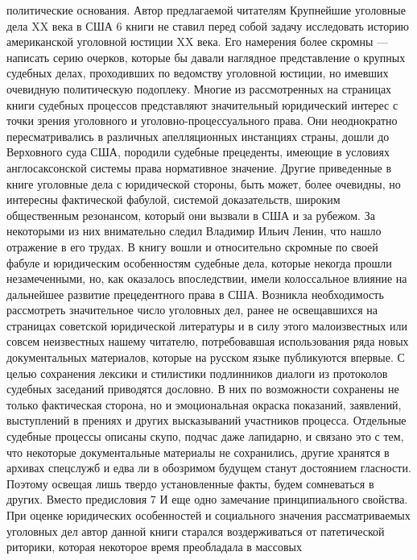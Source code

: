 \documentclass[12pt, a4paper, openany]{book}
\begin{document}
политические основания. Автор предлагаемой читателям 
Крупнейшие уголовные дела XX века в США 
6 
книги не ставил перед собой задачу исследовать историю 
американской уголовной юстиции XX века. Его намерения 
более скромны — написать серию очерков, которые бы 
давали наглядное представление о крупных судебных 
делах, проходивших по ведомству уголовной юстиции, но 
имевших очевидную политическую подоплеку. 
Многие из рассмотренных на страницах книги  
судебных процессов представляют значительный юридический 
интерес с точки зрения уголовного и  
уголовно-процессуального права. Они неоднократно пересматривались в  
различных апелляционных инстанциях страны, дошли до  
Верховного суда США, породили судебные прецеденты, имеющие 
в условиях англосаксонской системы права нормативное 
значение. Другие приведенные в книге уголовные дела 
с юридической стороны, быть может, более очевидны, но 
интересны фактической фабулой, системой доказательств, 
широким общественным резонансом, который они вызвали 
в США и за рубежом. За некоторыми из них внимательно 
следил Владимир Ильич Ленин, что нашло отражение в его 
трудах. 
В книгу вошли и относительно скромные по своей 
фабуле и юридическим особенностям судебные дела, 
которые некогда прошли незамеченными, но, как оказалось 
впоследствии, имели колоссальное влияние на дальнейшее 
развитие прецедентного права в США. Возникла  
необходимость рассмотреть значительное число уголовных дел, 
ранее не освещавшихся на страницах советской  
юридической литературы и в силу этого малоизвестных или совсем 
неизвестных нашему читателю, потребовавшая  
использования ряда новых документальных материалов, которые на 
русском языке публикуются впервые. С целью сохранения 
лексики и стилистики подлинников диалоги из протоколов 
судебных заседаний приводятся дословно. В них по 
возможности сохранены не только фактическая сторона, 
но и эмоциональная окраска показаний, заявлений,  
выступлений в прениях и других высказываний участников 
процесса. 
Отдельные судебные процессы описаны скупо, подчас 
даже лапидарно, и связано это с тем, что некоторые 
документальные материалы не сохранились, другие  
хранятся в архивах спецслужб и едва ли в обозримом будущем 
станут достоянием гласности. Поэтому освещая лишь 
твердо установленные факты, будем сомневаться в других. 
Вместо предисловия 
7 
И еще одно замечание принципиального свойства. 
При оценке юридических особенностей и социального 
значения рассматриваемых уголовных дел автор данной 
книги старался воздерживаться от патетической риторики, 
которая некоторое время преобладала в массовых  
\end{document}
